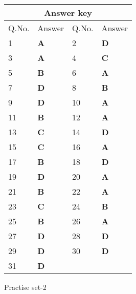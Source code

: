 \setlength\arrayrulewidth{1pt}
\begin{table}[H]
	\centering
	\begin{tabular}{|p{1.5cm}|p{1.5cm}||p{1.5cm}|p{1.5cm}|}
		\hline
		\multicolumn{4}{|c|}{\textbf{Answer key}}\\\hline\hline
		\rowcolor{ocrel}Q.No.&Answer&Q.No.&Answer\\\hline
		1&\textbf{A} &2&\textbf{D}\\\hline 
		3&\textbf{A} &4&\textbf{C} \\\hline
		5&\textbf{B} &6&\textbf{A} \\\hline
		7&\textbf{D}&8&\textbf{B}\\\hline
		9&\textbf{D}&10&\textbf{A}\\\hline
		11&\textbf{B} &12&\textbf{A}\\\hline
		13&\textbf{C}&14&\textbf{D}\\\hline
		15&\textbf{C}&16&\textbf{A} \\\hline
		17&\textbf{B}&18&\textbf{D}\\\hline
		19&\textbf{D}&20&\textbf{A}\\\hline
		21&\textbf{B} &22&\textbf{A}\\\hline
		23&\textbf{C}&24&\textbf{B}\\\hline
		25&\textbf{B}&26&\textbf{A} \\\hline
		27&\textbf{D}&28&\textbf{D}\\\hline
		29&\textbf{D}&30&\textbf{D}\\\hline
		31&\textbf{D} &&\textbf{}\\\hline
	\end{tabular}
\end{table}
\newpage
\begin{abox}
	Practise set-2
\end{abox}

